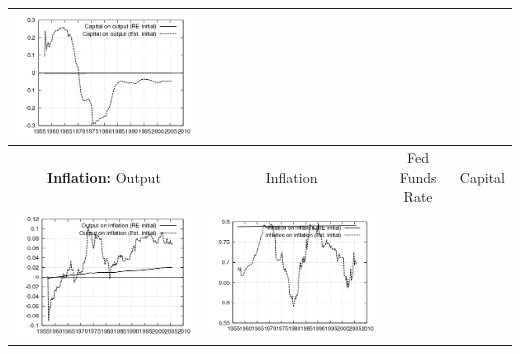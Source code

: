 \documentclass{beamer}
\begin{document}
{\begin{tabular}{|cccc|}
  \includegraphics[scale=0.17]{plots2/cap_initest_Capital_on_output.png} \\ \hline
  \small{\textbf{Inflation:} Output} & \small{Inflation} & \small{Fed Funds Rate} & \small{Capital} \\ \hline
  \includegraphics[scale=0.17]{plots2/cap_initest_Output_on_inflation.png} &
  \includegraphics[scale=0.17]{plots2/cap_initest_Inflation_on_inflation.png} &

\end{tabular}}
\end{document}
